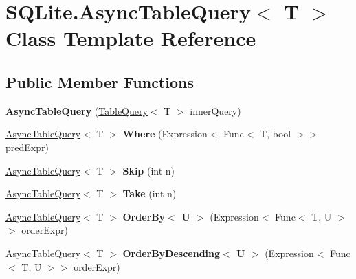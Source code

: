 \hypertarget{classSQLite_1_1AsyncTableQuery}{}\section{S\+Q\+Lite.\+Async\+Table\+Query$<$ T $>$ Class Template Reference}
\label{classSQLite_1_1AsyncTableQuery}
\subsection*{Public Member Functions}
\begin{DoxyCompactItemize}
\item 
\hypertarget{classSQLite_1_1AsyncTableQuery_a0255986ac768d5fca5b4e2c9840da35d}{}{\bfseries Async\+Table\+Query} (\hyperlink{classSQLite_1_1TableQuery}{Table\+Query}$<$ T $>$ inner\+Query)\label{classSQLite_1_1AsyncTableQuery_a0255986ac768d5fca5b4e2c9840da35d}

\item 
\hypertarget{classSQLite_1_1AsyncTableQuery_afe04f8363082a033b984230c7a245dea}{}\hyperlink{classSQLite_1_1AsyncTableQuery}{Async\+Table\+Query}$<$ T $>$ {\bfseries Where} (Expression$<$ Func$<$ T, bool $>$$>$ pred\+Expr)\label{classSQLite_1_1AsyncTableQuery_afe04f8363082a033b984230c7a245dea}

\item 
\hypertarget{classSQLite_1_1AsyncTableQuery_ab1b8210413273abe6bc9383bc4f7ea9c}{}\hyperlink{classSQLite_1_1AsyncTableQuery}{Async\+Table\+Query}$<$ T $>$ {\bfseries Skip} (int n)\label{classSQLite_1_1AsyncTableQuery_ab1b8210413273abe6bc9383bc4f7ea9c}

\item 
\hypertarget{classSQLite_1_1AsyncTableQuery_a6c47c652b3b8123e2d4961263c289af9}{}\hyperlink{classSQLite_1_1AsyncTableQuery}{Async\+Table\+Query}$<$ T $>$ {\bfseries Take} (int n)\label{classSQLite_1_1AsyncTableQuery_a6c47c652b3b8123e2d4961263c289af9}

\item 
\hypertarget{classSQLite_1_1AsyncTableQuery_a41540b08c3c49c123b57de8a0a5e3aea}{}\hyperlink{classSQLite_1_1AsyncTableQuery}{Async\+Table\+Query}$<$ T $>$ {\bfseries Order\+By$<$ U $>$} (Expression$<$ Func$<$ T, U $>$$>$ order\+Expr)\label{classSQLite_1_1AsyncTableQuery_a41540b08c3c49c123b57de8a0a5e3aea}

\item 
\hypertarget{classSQLite_1_1AsyncTableQuery_a4a45b5c81ccf4459f17d66fba6a18c3f}{}\hyperlink{classSQLite_1_1AsyncTableQuery}{Async\+Table\+Query}$<$ T $>$ {\bfseries Order\+By\+Descending$<$ U $>$} (Expression$<$ Func$<$ T, U $>$$>$ order\+Expr)\label{classSQLite_1_1AsyncTableQuery_a4a45b5c81ccf4459f17d66fba6a18c3f}


\end{DoxyCompactItemize}
